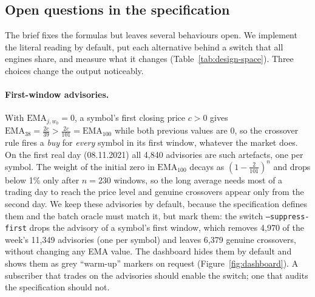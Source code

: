\subsection{Open questions in the specification}
\label{sec:design-space}

The brief fixes the formulas but leaves several behaviours open.
We implement the literal reading by default, put each alternative behind a switch that all engines share, and measure what it changes (Table~\ref{tab:design-space}).
Three choices change the output noticeably.

\paragraph{First-window advisories.}
With $\mathrm{EMA}_{j,w_0}=0$, a symbol's first closing price $c>0$ gives $\mathrm{EMA}_{38}=\frac{2c}{39} > \frac{2c}{101}=\mathrm{EMA}_{100}$ while both previous values are $0$, so the crossover rule fires a \emph{buy} for \emph{every} symbol in its first window, whatever the market does.
On the first real day (08.11.2021) all 4,840 advisories are such artefacts, one per symbol.
The weight of the initial zero in $\mathrm{EMA}_{100}$ decays as $(1-\frac{2}{101})^n$ and drops below 1\% only after $n=230$ windows, so the long average needs most of a trading day to reach the price level and genuine crossovers appear only from the second day.
We keep these advisories by default, because the specification defines them and the batch oracle must match it, but mark them: the switch \texttt{--suppress-first} drops the advisory of a symbol's first window, which removes 4,970 of the week's 11,349 advisories (one per symbol) and leaves 6,379 genuine crossovers, without changing any EMA value.
The dashboard hides them by default and shows them as grey ``warm-up'' markers on request (Figure~\ref{fig:dashboard}).
A subscriber that trades on the advisories should enable the switch; one that audits the specification should not.

